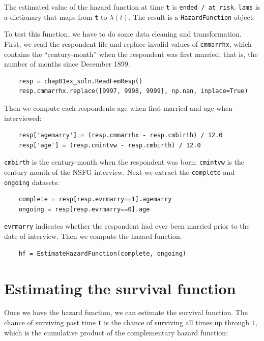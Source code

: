 \documentclass[12pt]{book}
\begin{document}
The estimated value of the hazard function at time {\tt t} is
\verb"ended / at_risk".  {\tt lams} is a dictionary that maps
from {\tt t} to $\lambda(t)$.  The result is a {\tt HazardFunction}
object.

To test this function, we have to do some data cleaning and transformation.
First, we read the respondent file and replace invalid values of
{\tt cmmarrhx}, which contains the ``century-month'' when the
respondent was first married; that is, the number of months since
December 1899.

\begin{verbatim}
    resp = chap01ex_soln.ReadFemResp()
    resp.cmmarrhx.replace([9997, 9998, 9999], np.nan, inplace=True)
\end{verbatim}

Then we compute each respondents age when first married and age when
interviewed:

\begin{verbatim}
    resp['agemarry'] = (resp.cmmarrhx - resp.cmbirth) / 12.0
    resp['age'] = (resp.cmintvw - resp.cmbirth) / 12.0
\end{verbatim}

{\tt cmbirth} is the century-month when the respondent was born;
{\tt cmintvw} is the century-month of the NSFG interview.  Next
we extract the {\tt complete} and {\tt ongoing} datasets:

\begin{verbatim}
    complete = resp[resp.evrmarry==1].agemarry
    ongoing = resp[resp.evrmarry==0].age
\end{verbatim}

{\tt evrmarry} indicates whether the respondent had ever been
married prior to the date of interview.  Then we compute the
hazard function.

\begin{verbatim}
    hf = EstimateHazardFunction(complete, ongoing)
\end{verbatim}


\section{Estimating the survival function}

Once we have the hazard function, we can estimate the survival function.
The chance of surviving past time {\tt t} is the chance of surviving
all times up through {\tt t}, which is the cumulative product of
the complementary hazard function:
\end{document}
